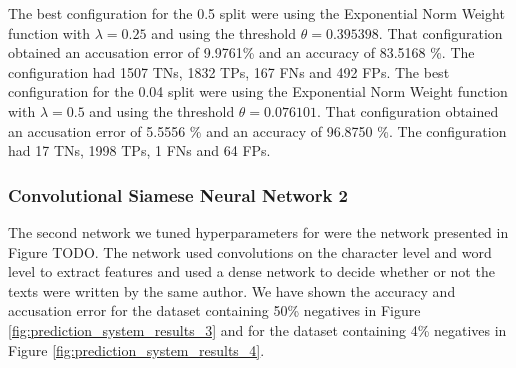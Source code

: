 The best configuration for the 0.5 split were using the Exponential Norm Weight
function with $\lambda = 0.25$ and using the threshold $\theta = 0.395398$.
That configuration obtained an accusation error of 9.9761\% and an accuracy of
83.5168 \%. The configuration had 1507 \gls{TN}s, 1832 \gls{TP}s, 167 \gls{FN}s
and 492 \gls{FP}s. The best configuration for the 0.04 split were using the
Exponential Norm Weight function with $\lambda = 0.5$ and using the threshold
$\theta = 0.076101$. That configuration obtained an accusation error of 5.5556
\% and an accuracy of 96.8750 \%. The configuration had 17 \gls{TN}s, 1998
\gls{TP}s, 1 \gls{FN}s and 64 \gls{FP}s.


\subsubsection{Convolutional Siamese Neural Network 2}

The second network we tuned hyperparameters for were the network presented
in Figure TODO. The network used convolutions on the character level and
word level to extract features and used a dense network to decide whether or
not the texts were written by the same author. We have shown the accuracy
and accusation error for the dataset containing 50\% negatives in Figure
\ref{fig:prediction_system_results_3} and for the dataset containing 4\%
negatives in Figure \ref{fig:prediction_system_results_4}.

